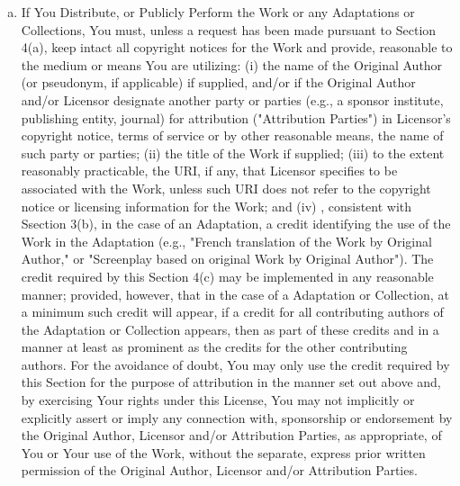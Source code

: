 \begin{enumerate}[a.]
          \item If You Distribute, or Publicly Perform the Work or
          any Adaptations or Collections, You must, unless a
          request has been made pursuant to Section 4(a), keep
          intact all copyright notices for the Work and provide,
          reasonable to the medium or means You are utilizing: (i)
          the name of the Original Author (or pseudonym, if
          applicable) if supplied, and/or if the Original Author
          and/or Licensor designate another party or parties (e.g.,
          a sponsor institute, publishing entity, journal) for
          attribution ("Attribution Parties") in Licensor's
          copyright notice, terms of service or by other reasonable
          means, the name of such party or parties; (ii) the title
          of the Work if supplied; (iii) to the extent reasonably
          practicable, the URI, if any, that Licensor specifies to
          be associated with the Work, unless such URI does not
          refer to the copyright notice or licensing information
          for the Work; and (iv) , consistent with Ssection 3(b),
          in the case of an Adaptation, a credit identifying the
          use of the Work in the Adaptation (e.g., "French
          translation of the Work by Original Author," or
          "Screenplay based on original Work by Original Author").
          The credit required by this Section 4(c) may be
          implemented in any reasonable manner; provided, however,
          that in the case of a Adaptation or Collection, at a
          minimum such credit will appear, if a credit for all
          contributing authors of the Adaptation or Collection
          appears, then as part of these credits and in a manner at
          least as prominent as the credits for the other
          contributing authors. For the avoidance of doubt, You may
          only use the credit required by this Section for the
          purpose of attribution in the manner set out above and,
          by exercising Your rights under this License, You may not
          implicitly or explicitly assert or imply any connection
          with, sponsorship or endorsement by the Original Author,
          Licensor and/or Attribution Parties, as appropriate, of
          You or Your use of the Work, without the separate,
          express prior written permission of the Original Author,
          Licensor and/or Attribution Parties.


\end{enumerate}
